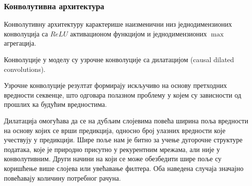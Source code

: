 \documentclass[11pt]{article}
\begin{document}
\subsubsection{Конволутивна архитектура}
\label{sec:org5c021fb}
Конволутивну архитектуру карактерише наизменични низ једнодимензионих конволуција са \(ReLU\) активационом функцијом и једнодимензионих \(\max\) агрегација.

Конволуције у моделу су узрочне конволуције са дилатацијом (causal dilated convolutions).

Узрочне конволуције резултат формирају искључиво на основу претходних вредности секвенце, што одговара полазном проблему у којем су зависности од прошлих ка будућим вредностима.

Дилатација омогућава да се на дубљим слојевима повећа ширина поља вредности на основу којих се врши предикција, односно број улазних вредности које учествују у предикцији. Шире поље нам је битно за учење дугорочне структуре података, које је природно присутно у рекурентним мрежама, али није у конволутивним. Други начини на који се може обезбедити шире поље су коришћење више слојева или увећавање филтера. Оба наведена случаја значајно повећавају количину потребног рачуна.
\end{document}
